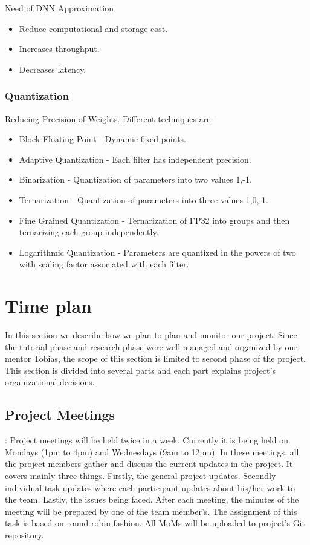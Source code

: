 \documentclass[titlepage]{report}
\begin{document}
Need of DNN Approximation
\begin{itemize}
    \item Reduce computational and storage cost.
    \item Increases throughput.
    \item Decreases latency.
\end{itemize}

\subsection{Quantization}
Reducing Precision of Weights. Different techniques are:-
\begin{itemize}
\item  Block Floating Point - Dynamic fixed points.
\item Adaptive Quantization - Each filter has independent precision.
\item Binarization - Quantization of parameters into two values {1,-1}.
\item Ternarization - Quantization of parameters into three values {1,0,-1}.
\item Fine Grained Quantization - Ternarization of FP32 into groups and then ternarizing each group independently.
\item Logarithmic Quantization - Parameters are quantized in the powers of two with scaling factor associated with each filter.
\end{itemize}


\chapter{Time plan}
In this section we describe how we plan to plan and monitor our project. Since the tutorial phase and research phase were well managed and organized by our mentor Tobias, the scope of this section is limited to second phase of the project. This section is divided into several parts and each part explains project’s organizational decisions. 

\section{Project Meetings}
: Project meetings will be held twice in a week. Currently it is being held on Mondays (1pm to 4pm) and Wednesdays (9am to 12pm). In these meetings, all the project members gather and discuss the current updates in the project. It covers mainly three things. Firstly, the general project updates. Secondly individual task updates where each participant updates about his/her work to the team. Lastly, the issues being faced. 
After each meeting, the minutes of the meeting will be prepared by one of the team member’s. The assignment of this task is based on round robin fashion. All MoMs will be uploaded to project’s Git repository.
\end{document}
